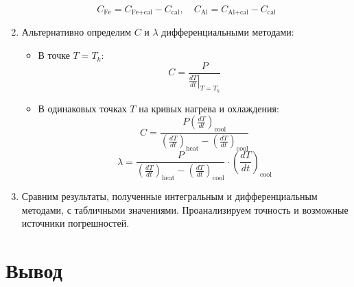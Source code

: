 \documentclass[a4paper,12pt]{article} %
\begin{document}
\begin{enumerate}
    \[
    C_{\text{Fe}} = C_{\text{Fe+cal}} - C_{\text{cal}}, \quad C_{\text{Al}} = C_{\text{Al+cal}} - C_{\text{cal}}
    \]

    \item Альтернативно определим $C$ и $\lambda$ дифференциальными методами:
    \begin{itemize}
        \item В точке $T = T_k$:
        \[
        C = \frac{P}{\left. \frac{dT}{dt} \right|_{T = T_k}}
        \]
        \item В одинаковых точках $T$ на кривых нагрева и охлаждения:
        \[
        C = \frac{P \left( \frac{dT}{dt} \right)_{\text{cool}}}{\left( \frac{dT}{dt} \right)_{\text{heat}} - \left( \frac{dT}{dt} \right)_{\text{cool}}}
        \]
        \[
        \lambda = \frac{P}{\left( \frac{dT}{dt} \right)_{\text{heat}} - \left( \frac{dT}{dt} \right)_{\text{cool}}} \cdot \left( \frac{dT}{dt} \right)_{\text{cool}}
        \]
    \end{itemize}

    \item Сравним результаты, полученные интегральным и дифференциальным методами, с табличными значениями. Проанализируем точность и возможные источники погрешностей.
\end{enumerate}

\section*{Вывод}
\end{document}
